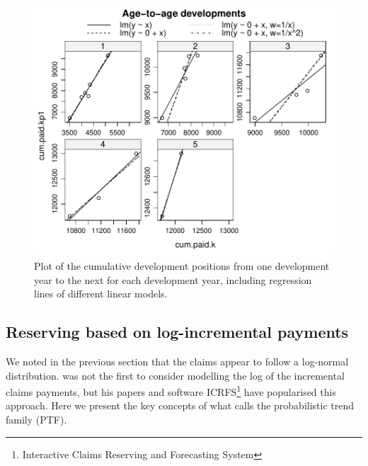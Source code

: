 \documentclass{article}
\begin{document}
\begin{figure}[thb][h]
\begin{center}
\includegraphics{Log-incremental-linerregressionplot}
\caption{Plot of the cumulative development positions from one development year to the next for each development year, including regression lines of different linear models.}\label{fig:linearregression}
\end{center}
\end{figure}



\subsection{Reserving based on log-incremental payments}


We noted in the previous section that the claims appear to follow a
log-normal distribution. \cite{Zehnwirth1994} was not the first to consider 
modelling the log of the incremental claims payments, but his papers and software 
ICRFS\footnote{Interactive Claims Reserving and Forecasting System} 
have popularised this  approach. Here we present the key concepts 
of what \cite{Zehnwirth1994} calls the probabilistic trend family (PTF). 
\end{document}
